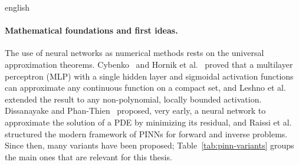 \documentclass[../0000.tex]{subfiles}
\begin{document}
\begin{hyphenrules}{english}
\paragraph{Mathematical foundations and first ideas.}
The use of neural networks as numerical methods rests on the universal approximation theorems.
Cybenko~\cite{cybenko1989} and Hornik et al.~\cite{hornik1989} proved that a multilayer perceptron (MLP) with a single
hidden layer and sigmoidal activation functions can approximate any continuous function on a compact
set, and Leshno et al.~\cite{leshno1993} extended the result to any non-polynomial, locally bounded activation.
Dissanayake and Phan-Thien~\cite{dissanayake1994} proposed, very early, a neural network to approximate the solution of a PDE
by minimizing its residual, and Raissi et al.~\cite{raissi2017a,raissi2017b,raissi2019} structured the modern
framework of PINNs for forward and inverse problems. Since then, many variants have been proposed;
Table~\ref{tab:pinn-variants} groups the main ones that are relevant for this thesis.


\end{hyphenrules}
\end{document}
